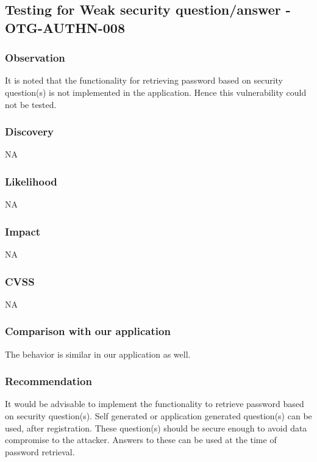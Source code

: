 \subsection{Testing for Weak security question/answer - OTG-AUTHN-008}

\subsubsection{Observation}
It is noted that the functionality for retrieving password based on security question(s) is not implemented in the application. Hence this vulnerability could not be tested.

\subsubsection{Discovery}
NA

\subsubsection{Likelihood}
NA

\subsubsection{Impact}
NA

\subsubsection{CVSS}
NA

\subsubsection{Comparison with our application}
The behavior is similar in our application as well.

\subsubsection{Recommendation}
It would be advisable to implement the functionality to retrieve password based on security question(s). Self generated or application generated question(s) can be used, after registration. These question(s) should be secure enough to avoid data compromise to the attacker. Answers to these can be used at the time of password retrieval.
\clearpage